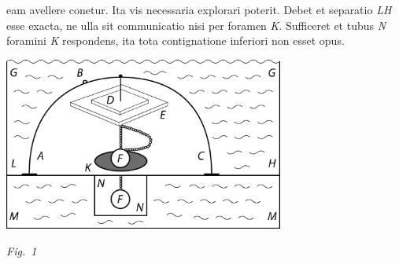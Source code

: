 eam avellere conetur.
Ita vis necessaria\protect{} explorari poterit.
Debet et separatio \textit{LH} esse exacta,\protect{}
ne ulla sit communicatio\protect{}
nisi per foramen \textit{K}.
Sufficeret et tubus\protect{} \textit{N}
foramini\protect{} \textit{K} respondens,
ita tota contignatione\protect{} inferiori non esset opus.
\pend%
%
\vspace{2.5em}%
\centerline{\includegraphics[width=0.69\textwidth]{gesamttex/edit_VIII,3/images/LH_37_03_118r_d.pdf}}%
\vspace{0.5em}
\centerline{\lbrack\textit{Fig.~1}\rbrack}%
%
\count{}
\count{}
\count{}
%
